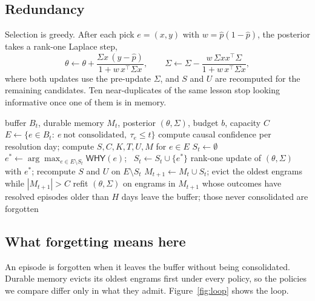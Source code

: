 \documentclass[11pt]{article}
\newcommand{\eqname}[1]{\textsf{#1}}
\begin{document}
\subsection{Redundancy}
Selection is greedy. After each pick $e=(x,y)$ with $w=\hat p(1-\hat p)$, the posterior takes a rank-one Laplace step,
\begin{equation}
\theta\leftarrow\theta+\frac{\Sigma x\,(y-\hat p)}{1+w\,x^\top\Sigma x},\qquad
\Sigma\leftarrow\Sigma-\frac{w\,\Sigma x x^\top\Sigma}{1+w\,x^\top\Sigma x},
\end{equation}
where both updates use the pre-update $\Sigma$, and $S$ and $U$ are recomputed for the remaining candidates. Ten near-duplicates of the same lesson stop looking informative once one of them is in memory.

\begin{algorithm}[t]
\caption{Dream cycle (one night)}
\label{alg:dream}
\small
\begin{algorithmic}[1]
\Require buffer $B_t$, durable memory $M_t$, posterior $(\theta,\Sigma)$, budget $b$, capacity $C$
\State $E\gets\{e\in B_t:\ e\ \text{not consolidated},\ \tau_e\le t\}$ 
\State compute causal confidence per resolution day; compute $S,C,K,T,U,M$ for $e\in E$
\State $S_t\gets\emptyset$
  \State $e^\ast\gets\arg\max_{e\in E\setminus S_t}\eqname{WHY}(e)$; \ $S_t\gets S_t\cup\{e^\ast\}$
  \State rank-one update of $(\theta,\Sigma)$ with $e^\ast$; recompute $S$ and $U$ on $E\setminus S_t$
\EndFor
\State $M_{t+1}\gets M_t\cup S_t$; evict the oldest engrams while $|M_{t+1}|>C$
\State refit $(\theta,\Sigma)$ on engrams in $M_{t+1}$ whose outcomes have resolved
\State episodes older than $H$ days leave the buffer; those never consolidated are forgotten
\end{algorithmic}
\end{algorithm}

\subsection{What forgetting means here}
An episode is forgotten when it leaves the buffer without being consolidated. Durable memory evicts its oldest engrams first under every policy, so the policies we compare differ only in what they admit. Figure~\ref{fig:loop} shows the loop.
\end{document}
